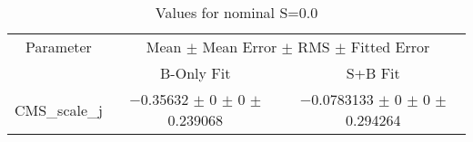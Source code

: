 \begin{table}
\centering
\caption{Values for nominal S=0.0}
\begin{tabular}{ccc}
\toprule
Parameter & \multicolumn{2}{c}{Mean $\pm$ Mean Error $\pm$ RMS $\pm$ Fitted Error}\\
 & B-Only Fit & S+B Fit\\
\midrule
CMS\_scale\_j & \num{-0.35632} $\pm$ \num{0} $\pm$ \num{0} $\pm$ \num{0.239068} & \num{-0.0783133} $\pm$ \num{0} $\pm$ \num{0} $\pm$ \num{0.294264}\\
\bottomrule
\end{tabular}
\end{table}